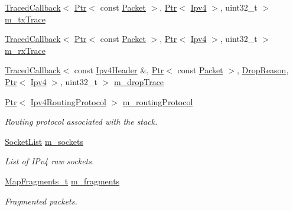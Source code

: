 \begin{DoxyCompactItemize}
\hyperlink{classns3_1_1TracedCallback}{Traced\+Callback}$<$ \hyperlink{classns3_1_1Ptr}{Ptr}$<$ const \hyperlink{classns3_1_1Packet}{Packet} $>$, \hyperlink{classns3_1_1Ptr}{Ptr}$<$ \hyperlink{classns3_1_1Ipv4}{Ipv4} $>$, uint32\+\_\+t $>$ \hyperlink{classns3_1_1Ipv4L3Protocol_a91a19b062bd7e55da11615385e0e2788}{m\+\_\+tx\+Trace}
\item 
\hyperlink{classns3_1_1TracedCallback}{Traced\+Callback}$<$ \hyperlink{classns3_1_1Ptr}{Ptr}$<$ const \hyperlink{classns3_1_1Packet}{Packet} $>$, \hyperlink{classns3_1_1Ptr}{Ptr}$<$ \hyperlink{classns3_1_1Ipv4}{Ipv4} $>$, uint32\+\_\+t $>$ \hyperlink{classns3_1_1Ipv4L3Protocol_a8a973a63eb239c315d630c9ff300823a}{m\+\_\+rx\+Trace}
\item 
\hyperlink{classns3_1_1TracedCallback}{Traced\+Callback}$<$ const \hyperlink{classns3_1_1Ipv4Header}{Ipv4\+Header} \&, \hyperlink{classns3_1_1Ptr}{Ptr}$<$ const \hyperlink{classns3_1_1Packet}{Packet} $>$, \hyperlink{classns3_1_1Ipv4L3Protocol_a05e7403d60c79529257c4cffdd994da1}{Drop\+Reason}, \hyperlink{classns3_1_1Ptr}{Ptr}$<$ \hyperlink{classns3_1_1Ipv4}{Ipv4} $>$, uint32\+\_\+t $>$ \hyperlink{classns3_1_1Ipv4L3Protocol_a80984e2de6a2562b04195b975014cb1b}{m\+\_\+drop\+Trace}
\item 
\hyperlink{classns3_1_1Ptr}{Ptr}$<$ \hyperlink{classns3_1_1Ipv4RoutingProtocol}{Ipv4\+Routing\+Protocol} $>$ \hyperlink{classns3_1_1Ipv4L3Protocol_abc52052cbf9c4104be407221397c7a55}{m\+\_\+routing\+Protocol}
\begin{DoxyCompactList}\small\item\em Routing protocol associated with the stack. \end{DoxyCompactList}\item 
\hyperlink{classns3_1_1Ipv4L3Protocol_a3dd6ac663f7c8ccd87886bc864892dda}{Socket\+List} \hyperlink{classns3_1_1Ipv4L3Protocol_a5f3749c4a9bc9ee5a75f73c33f64aa7c}{m\+\_\+sockets}
\begin{DoxyCompactList}\small\item\em List of I\+Pv4 raw sockets. \end{DoxyCompactList}\item 
\hyperlink{classns3_1_1Ipv4L3Protocol_ac2b81caa9436d6a015bbbb68b6282481}{Map\+Fragments\+\_\+t} \hyperlink{classns3_1_1Ipv4L3Protocol_a0eb853df4608f63e9447d8a33d427ccf}{m\+\_\+fragments}
\begin{DoxyCompactList}\small\item\em Fragmented packets. \end{DoxyCompactList}\item 

\end{DoxyCompactItemize}
